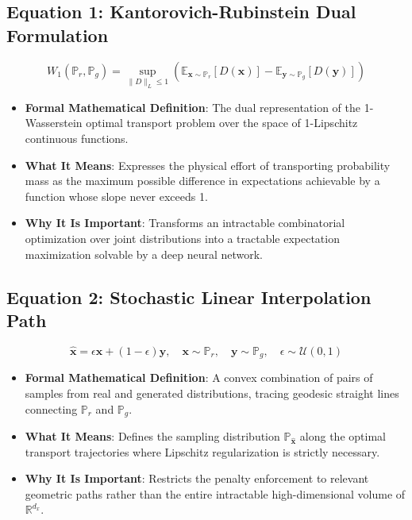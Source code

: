 \documentclass[11pt,a4paper]{article}
\theoremstyle{definition}
\begin{document}
\subsection{\textbf{Equation 1: Kantorovich-Rubinstein Dual Formulation}}
{\boldmath
\begin{equation}
W_1(\mathbb{P}_r, \mathbb{P}_g) = \sup_{\|D\|_L \le 1} \left( \mathbb{E}_{\mathbf{x} \sim \mathbb{P}_r}[D(\mathbf{x})] - \mathbb{E}_{\mathbf{y} \sim \mathbb{P}_g}[D(\mathbf{y})] \right)
\end{equation}
}
\begin{itemize}
    \item \textbf{Formal Mathematical Definition}:
    The dual representation of the 1-Wasserstein optimal transport problem over the space of 1-Lipschitz continuous functions.
    \item \textbf{What It Means}:
    Expresses the physical effort of transporting probability mass as the maximum possible difference in expectations achievable by a function whose slope never exceeds 1.
    \item \textbf{Why It Is Important}:
    Transforms an intractable combinatorial optimization over joint distributions into a tractable expectation maximization solvable by a deep neural network.
\end{itemize}

\subsection{\textbf{Equation 2: Stochastic Linear Interpolation Path}}
{\boldmath
\begin{equation}
\hat{\mathbf{x}} = \epsilon \mathbf{x} + (1 - \epsilon)\mathbf{y}, \quad \mathbf{x} \sim \mathbb{P}_r, \quad \mathbf{y} \sim \mathbb{P}_g, \quad \epsilon \sim \mathcal{U}(0, 1)
\end{equation}
}
\begin{itemize}
    \item \textbf{Formal Mathematical Definition}:
    A convex combination of pairs of samples from real and generated distributions, tracing geodesic straight lines connecting $\mathbb{P}_r$ and $\mathbb{P}_g$.
    \item \textbf{What It Means}:
    Defines the sampling distribution $\mathbb{P}_{\hat{\mathbf{x}}}$ along the optimal transport trajectories where Lipschitz regularization is strictly necessary.
    \item \textbf{Why It Is Important}:
    Restricts the penalty enforcement to relevant geometric paths rather than the entire intractable high-dimensional volume of $\mathbb{R}^{d_x}$.
\end{itemize}
\end{document}
